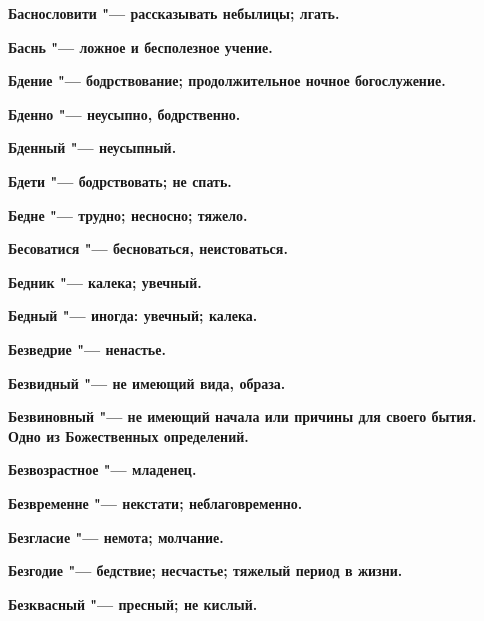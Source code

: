\begin{multicols}{2}
\bfseries Баснословити\normalfont{} "--- рассказывать небылицы; лгать. 




\bfseries Баснь\normalfont{} "--- ложное и бесполезное учение. 




\bfseries Бдение\normalfont{} "--- бодрствование; продолжительное ночное богослужение. 




\bfseries Бденно\normalfont{} "--- неусыпно, бодрственно. 




\bfseries Бденный\normalfont{} "--- неусыпный. 




\bfseries Бдети\normalfont{} "--- бодрствовать; не спать. 




\bfseries Бедне\normalfont{} "--- трудно; несносно; тяжело. 




\bfseries Бесоватися\normalfont{} "--- бесноваться, неистоваться. 




\bfseries Бедник\normalfont{} "--- калека; увечный. 




\bfseries Бедный\normalfont{} "--- иногда: увечный; калека. 




\bfseries Безведрие\normalfont{} "--- ненастье. 




\bfseries Безвидный\normalfont{} "--- не имеющий вида, образа. 




\bfseries Безвиновный\normalfont{} "--- не имеющий начала или причины для своего бытия. Одно из Божественных определений. 




\bfseries Безвозрастное\normalfont{} "--- младенец. 




\bfseries Безвременне\normalfont{} "--- некстати; неблаговременно. 




\bfseries Безгласие\normalfont{} "--- немота; молчание. 




\bfseries Безгодие\normalfont{} "--- бедствие; несчастье; тяжелый период в жизни. 




\bfseries Безквасный\normalfont{} "--- пресный; не кислый. 





\end{multicols}
